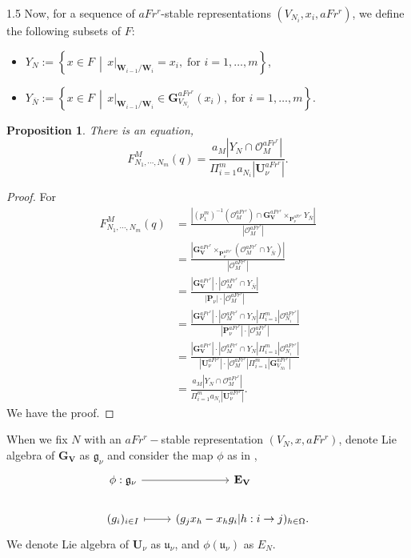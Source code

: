 \documentclass[10pt]{amsart}
\newtheorem{proposition}[theorem]{Proposition}
\def\bfV{{\mathbf V}}
\def\bfV{\mathbf{V}}
\def\bfW{\mathbf{W}}
\def\bfE{\mathbf{E}}
\def\bfG{\mathbf{G}}
\def\bfU{\mathbf{U}}
\newcommand\mo{{\mathcal{O}}}
\begin{document}
\begin{spacing}{1.5}
Now, for a sequence of $aFr^r$-stable representations $(V_{N_i}, x_i, aFr^r)$, we define the following subsets of $F$:
\begin{itemize}
    \item $Y_N := \left\{ x \in F \,\middle|\, x|_{\bfW_{i-1}/\bfW_i} = x_i,\; \text{for } i = 1, \dots, m \right\}$,
    \item $Y_{\bar{N}} := \left\{ x \in F \,\middle|\, x|_{\bfW_{i-1}/\bfW_i} \in \bfG_{V_{N_i}}^{aFr^r}(x_i),\; \text{for } i = 1, \dots, m \right\}$.
\end{itemize}
\begin{proposition}
    There is an equation,$$F_{N_1,\cdots,N_m}^M(q)=\frac{a_M|Y_N\cap\mo_{M}^{aFr^r}|}{\Pi_{i=1}^ma_{N_i}|\bfU_{\nu}^{aFr^r}|}.$$
\end{proposition}
\begin{proof}
    For \begin{align*}
        F_{N_1,\cdots,N_m}^M(q)&=\frac{|(p_1^m)^{-1}(\mo_{M}^{aFr^r})\cap \bfG_{\bfV}^{aFr^r}\times_{\mathbf{P}_{\nu}^{aFr^r}}Y_{\bar{N}}|}{|\mo_{M}^{aFr^r}|}\\&=\frac{|\bfG_{\bfV}^{aFr^r}\times_{\mathbf{P}_{\nu}^{aFr^r}}(\mo_{M}^{aFr^r}\cap Y_{\bar{N}})|}{|\mo_{M}^{aFr^r}|}\\&=\frac{|\bfG_{\bfV}^{aFr^r}|\cdot|\mo_{M}^{aFr^r}\cap Y_{\bar{N}}|}{|\mathbf{P}_{\nu}|\cdot |\mo_{M}^{aFr^r}|}\\&=\frac{|\bfG_{\bfV}^{aFr^r}|\cdot|\mo_{M}^{aFr^r}\cap Y_{N}|\Pi_{i=1}^m|\mo_{N_i}^{aFr^r}|}{|\mathbf{P}_{\nu}^{aFr^r}|\cdot |\mo_{M}^{aFr^r}|}\\&=\frac{|\bfG_{\bfV}^{aFr^r}|\cdot|\mo_{M}^{aFr^r}\cap Y_{N}|\Pi_{i=1}^m|\mo_{N_i}^{aFr^r}|}{|\mathbf{U}_{\nu}^{aFr^r}|\cdot |\mo_{M}^{aFr^r}|\Pi_{i=1}^m|\bfG_{V_{Ni}}^{aFr^r}|}\\&=\frac{a_M|Y_N\cap\mo_{M}^{aFr^r}|}{\Pi_{i=1}^ma_{N_i}|\bfU_{\nu}^{aFr^r}|}.
    \end{align*}
    We have the proof.
\end{proof}
When we fix $N$ with an $aFr^r-$stable representation $(V_N,x,aFr^r)$, denote Lie algebra of $\bfG_{\bfV}$ as $\mathfrak{g}_{\nu}$ and consider the map $\phi$ as in \cite[2.5]{2004The},  $$\begin{tikzcd}
{\phi:\mathfrak{g}_{\nu}} \arrow[r]  & \bfE_{\bfV}                        \\
(g_i)_{i\in I} \arrow[r, maps to] & (g_jx_h-x_hg_i|h:i\rightarrow j)_{h\in \Omega}.
\end{tikzcd}$$
We denote Lie algebra of $\bfU_{\nu}$ as $\mathfrak{u}_{\nu}$, and $\phi(\mathfrak{u}_{\nu})$ as $E_{N}$.


\end{spacing}
\end{document}
